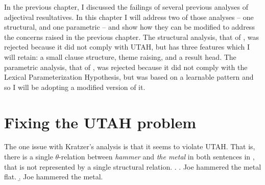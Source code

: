 \documentclass[MilwayThesis]{subfiles}
\begin{document}
In the previous chapter, I discussed the failings of several previous analyses of adjectival resultatives.
In this chapter I will address two of those analyses -- one structural, and one parametric -- and show how they can be modified to address the concerns raised in the previous chapter.
The structural analysis, that of \textcite{kratzer2004building}, was rejected because it did not comply with UTAH, but has three features which I will retain: a small clause structure, theme raising, and a result head.
The parametric analysis, that of \textcite{snyder1995language,snyder2012parameter}, was rejected because it did not comply with the Lexical Parameterization Hypothesis, but was based on a learnable pattern and so I will be adopting a modified version of it.
\section{Fixing the UTAH problem}
The one issue with Kratzer's analysis is that it seems to violate UTAH.
That is, there is a single $\theta$-relation between \textit{hammer} and \textit{the metal} in both sentences in \Next, that is not represented by a single structural relation.
\ex.
\a. Joe hammered the metal flat.
\b. Joe hammered the metal.
\end{document}

